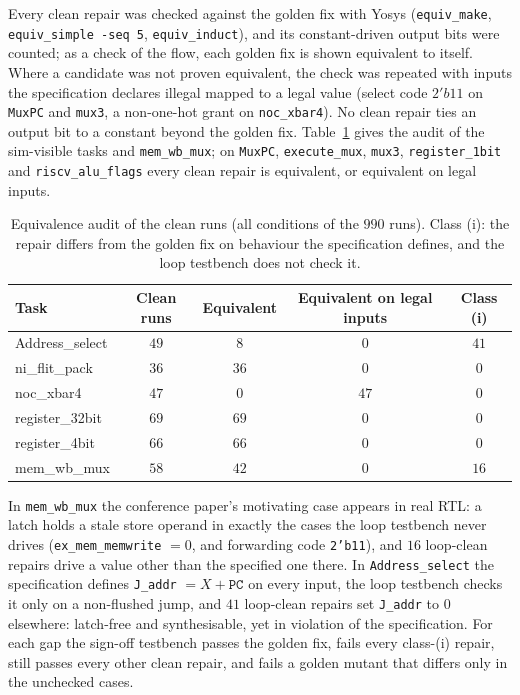 \documentclass[11pt]{article}
\begin{document}
Every clean repair was checked against the golden fix with Yosys
(\texttt{equiv\_make}, \texttt{equiv\_simple -seq 5}, \texttt{equiv\_induct}),
and its constant-driven output bits were counted; as a check of the flow, each
golden fix is shown equivalent to itself. Where a candidate was not proven equivalent, the
check was repeated with inputs the specification declares illegal mapped to a
legal value (select code $2'b11$ on \texttt{MuxPC} and \texttt{mux3}, a
non-one-hot grant on \texttt{noc\_xbar4}). No clean repair ties an output bit
to a constant beyond the golden fix. Table~\ref{tab:audit} gives the audit of
the sim-visible tasks and \texttt{mem\_wb\_mux}; on \texttt{MuxPC},
\texttt{execute\_mux}, \texttt{mux3}, \texttt{register\_1bit} and
\texttt{riscv\_alu\_flags} every clean repair is equivalent, or equivalent on
legal inputs.

\begin{table}[htbp]
\centering
\caption{Equivalence audit of the clean runs (all conditions of the $990$
runs). Class (i): the repair differs from the golden fix on behaviour the
specification defines, and the loop testbench does not check it.}
\label{tab:audit}
\small
\begin{tabular}{@{}l c c c c@{}}
\toprule
\textbf{Task} & \textbf{Clean runs} & \textbf{Equivalent} & \textbf{Equivalent on legal inputs} & \textbf{Class (i)} \\
\midrule
Address\_select  & $49$ & $8$  & $0$  & $41$ \\
ni\_flit\_pack   & $36$ & $36$ & $0$  & $0$ \\
noc\_xbar4       & $47$ & $0$  & $47$ & $0$ \\
register\_32bit  & $69$ & $69$ & $0$  & $0$ \\
register\_4bit   & $66$ & $66$ & $0$  & $0$ \\
mem\_wb\_mux     & $58$ & $42$ & $0$  & $16$ \\
\bottomrule
\end{tabular}
\end{table}

In \texttt{mem\_wb\_mux} the conference paper's motivating case appears in
real RTL: a latch holds a stale store operand in exactly the cases the loop
testbench never drives (\texttt{ex\_mem\_memwrite} $=0$, and forwarding code
\texttt{2'b11}), and $16$ loop-clean repairs drive a value other than the
specified one there. In \texttt{Address\_select} the specification defines
\texttt{J\_addr} $= X + \texttt{PC}$ on every input, the loop testbench checks
it only on a non-flushed jump, and $41$ loop-clean repairs set \texttt{J\_addr}
to $0$ elsewhere: latch-free and synthesisable, yet in
violation of the specification. For each gap the sign-off testbench passes the
golden fix, fails every class-(i) repair, still passes every other clean
repair, and fails a golden mutant that differs only in the unchecked cases.
\end{document}
